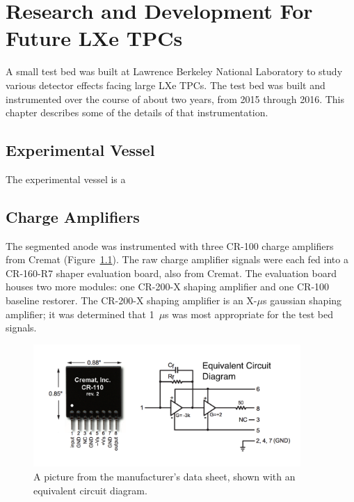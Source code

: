 \chapter{Research and Development For Future LXe TPCs}

\label{ch:RandD} %

A small test bed was built at Lawrence Berkeley National Laboratory to study various detector effects facing large \ac{LXe} \ac{TPC}s. The test bed was built and instrumented over the course of about two years, from 2015 through 2016. This chapter describes some of the details of that instrumentation.

\section{Experimental Vessel}
The experimental vessel is a 

\section{Charge Amplifiers}
The segmented anode was instrumented with three CR-100 charge amplifiers from Cremat (Figure~\ref{fig:cr110}). The raw charge amplifier signals were each fed into a CR-160-R7 shaper evaluation board, also from Cremat. The evaluation board houses two more modules: one CR-200-X shaping amplifier and one CR-100 baseline restorer. The CR-200-X shaping amplifier is an X-$\mu$s gaussian shaping amplifier; it was determined that 1~$\mu$s was most appropriate for the test bed signals.

\begin{figure}[htbp]
\begin{center}
\includegraphics[width=4in]{figures/testbed/cr110.png}
\caption{A picture from the manufacturer's data sheet, shown with an equivalent circuit diagram.}
\label{fig:cr110}
\end{center}
\end{figure}

